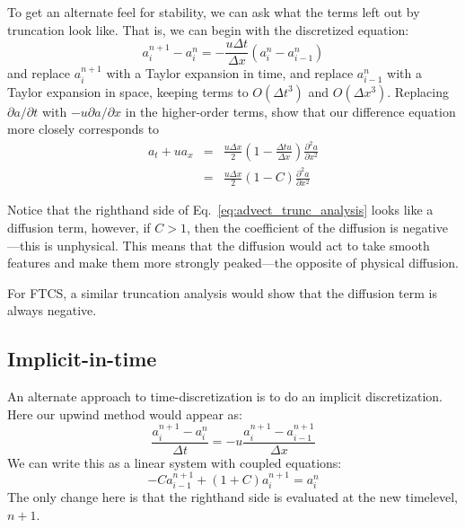 \begin{exercise}
{To get an alternate feel for stability, we can ask
  what the terms left out by truncation look like.  That is, we can
  begin with the discretized equation:
\begin{equation}
  a_i^{n+1} - a_i^n = -\frac{u \Delta t}{\Delta x} ( a_i^n - a_{i-1}^n )
\end{equation}
and replace $a_i^{n+1}$ with a Taylor expansion in time, and replace
$a_{i-1}^n$ with a Taylor expansion in space, keeping terms to
$O(\Delta t^3)$ and $O(\Delta x^3)$.  Replacing $\partial a/\partial t$
with $-u \partial a/ \partial x$ in the higher-order terms, show 
that our difference equation more closely corresponds to 
\begin{eqnarray}
\label{eq:advect_trunc_analysis}
a_t + u a_x &=& \frac{u \Delta x}{2} \left ( 1 - \frac{\Delta t u}{\Delta x} \right ) \frac{\partial^2 a}{\partial x^2} \\
            &=& \frac{u \Delta x}{2} (1 - C) \frac{\partial^2 a}{\partial x^2}
\end{eqnarray}
}
\end{exercise}


Notice that the righthand side of Eq.~\ref{eq:advect_trunc_analysis}
looks like a diffusion term, however, if $C > 1$, then the coefficient
of the diffusion is negative---this is unphysical.  This means that
the diffusion would act to take smooth features and make them more
strongly peaked---the opposite of physical diffusion.

For FTCS, a similar truncation analysis would show that the diffusion term
is always negative.

\subsection{Implicit-in-time}

An alternate approach to time-discretization is to do an implicit
discretization.  Here our upwind method would appear as:
\begin{equation}
\frac{a^{n+1}_i - a^n_i}{\Delta t} = -u \frac{a^{n+1}_i - a^{n+1}_{i-1}}{\Delta x}
\end{equation}
We can write this as a linear system with coupled equations:
\begin{equation}
-C a^{n+1}_{i-1} + (1 + C) a^{n+1}_i = a_i^n
\end{equation}
The only change here is that the righthand side is evaluated at the new timelevel,
$n+1$.

